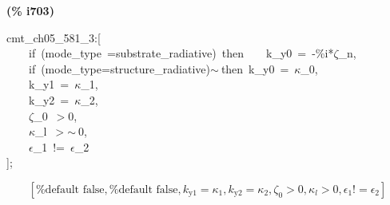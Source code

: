 \documentclass[fleqn]{article}
\begin{document}
\noindent
\begin{minipage}[t]{4.000000em}\color{red}\bfseries
(\% i703)	
\end{minipage}
\begin{minipage}[t]{\textwidth}\color{blue}
cmt\_ch05\_581\_3:[\\
\ \ \ \ if\ (mode\_type\ =substrate\_radiative)\ then\ \ \ \ k\_y0\ =\ -\%i*\ensuremath{\zeta}\_n,\\
\ \ \ \ if\ (mode\_type=structure\_radiative)\ensuremath{\sim\ }then\ k\_y0\ =\ \ensuremath{\kappa}\_0,\\
\ \ \ \ k\_y1\ =\ \ensuremath{\kappa}\_1,\\
\ \ \ \ k\_y2\ =\ \ensuremath{\kappa}\_2,\\
\ \ \ \ \ensuremath{\zeta}\_0\ \ensuremath{>}0,\\
\ \ \ \ \ensuremath{\kappa}\_l\ \ensuremath{>}\ensuremath{\sim\ }0,\\
\ \ \ \ \ensuremath{\epsilon}\_1\ !=\ \ensuremath{\epsilon}\_2\\
];
\end{minipage}
\[\displaystyle \tag{\% o703} 
\left[ \mbox{%
false}\operatorname{,}\mbox{%
false}\operatorname{,}{k_{\ensuremath{\mathrm{y1}}}}={{\kappa }_1}\operatorname{,}{k_{\ensuremath{\mathrm{y2}}}}={{\kappa }_2}\operatorname{,}{{\zeta }_0}\operatorname{>  }0\operatorname{,}{{\kappa }_l}\operatorname{>  }0\operatorname{,}{{\epsilon }_1}\operatorname{!}={{\epsilon }_2}\right] \mbox{}
\]
\end{document}
